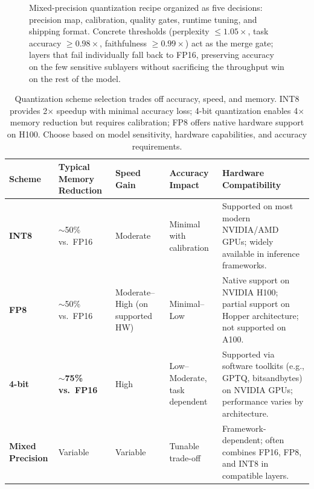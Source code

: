 \begin{figure}[t]
\begin{llmfigbox}
\end{llmfigbox}
\caption{Mixed-precision quantization recipe organized as five decisions: precision map, calibration, quality gates, runtime tuning, and shipping format. Concrete thresholds (perplexity $\leq\!1.05\times$, task accuracy $\geq\!0.98\times$, faithfulness $\geq\!0.99\times$) act as the merge gate; layers that fail individually fall back to FP16, preserving accuracy on the few sensitive sublayers without sacrificing the throughput win on the rest of the model.}
\label{fig:ch07_quantization_callout}
\end{figure}

\begin{table}[t]
\centering
\small
\caption{Quantization scheme selection trades off accuracy, speed, and memory. INT8 provides 2$\times$ speedup with minimal accuracy loss; 4-bit quantization enables 4$\times$ memory reduction but requires calibration; FP8 offers native hardware support on H100. Choose based on model sensitivity, hardware capabilities, and accuracy requirements.}
\label{tab:ch07_quantization_comparison}
\setlength{\tabcolsep}{6pt}
\renewcommand{\arraystretch}{1.3}
\begin{tabularx}{0.95\linewidth}{@{}>{\raggedright\arraybackslash\bfseries}p{2.2cm}>{\raggedright\arraybackslash}X>{\raggedright\arraybackslash}p{2cm}>{\raggedright\arraybackslash}p{2.2cm}>{\raggedright\arraybackslash}X@{}}
\toprule
\rowcolor{gray!15}
\textbf{Scheme} & \textbf{Typical Memory Reduction} & \textbf{Speed Gain} & \textbf{Accuracy Impact} & \textbf{Hardware Compatibility} \\
\midrule
\rowcolor{blue!8}
INT8 & $\sim$50\% vs.\ FP16 & Moderate & Minimal with calibration & Supported on most modern NVIDIA/AMD GPUs; widely available in inference frameworks. \\
\addlinespace[2pt]
\rowcolor{green!10}
FP8 & $\sim$50\% vs.\ FP16 & Moderate--High (on supported HW) & Minimal--Low & Native support on NVIDIA H100; partial support on Hopper architecture; not supported on A100. \\
\addlinespace[2pt]
\rowcolor{orange!10}
4-bit & \textcolor{orange!70!black}{\textbf{$\sim$75\% vs.\ FP16}} & High & Low--Moderate, task dependent & Supported via software toolkits (e.g., GPTQ, bitsandbytes) on NVIDIA GPUs; performance varies by architecture. \\
\addlinespace[2pt]
\rowcolor{blue!8}
Mixed Precision & Variable & Variable & Tunable trade-off & Framework-dependent; often combines FP16, FP8, and INT8 in compatible layers. \\
\bottomrule
\end{tabularx}
\end{table}

